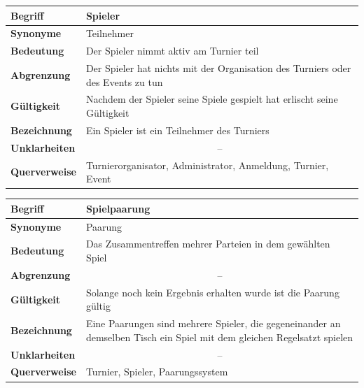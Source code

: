 \documentclass[11pt]{article}
\begin{document}
\begin{tabularx}{\textwidth}{| p{} | p{} |}
	\hline
	\textbf{Begriff} & Spieler\\
	\hline
	\textbf{Synonyme} & Teilnehmer \\
	\hline
	\textbf{Bedeutung} & Der Spieler nimmt aktiv am Turnier teil\\
	\hline
	\textbf{Abgrenzung} & Der Spieler hat nichts mit der Organisation des Turniers oder des Events zu tun\\
	\hline
	\textbf{Gültigkeit} & Nachdem der Spieler seine Spiele gespielt hat erlischt seine Gültigkeit\\
	\hline
	\textbf{Bezeichnung} & Ein Spieler ist ein Teilnehmer des Turniers\\
	\hline
	\textbf{Unklarheiten} & \multicolumn{1}{c|}{--} \\
	\hline
	\textbf{Querverweise} & Turnierorganisator, Administrator, Anmeldung, Turnier, Event \\
	\hline
\end{tabularx}
	
\begin{tabularx}{\textwidth}{| p{} | p{} |}
	\hline
	\textbf{Begriff} & Spielpaarung\\
	\hline
	\textbf{Synonyme} & Paarung\\
	\hline
	\textbf{Bedeutung} & Das Zusammentreffen mehrer Parteien in dem gewählten Spiel\\
	\hline
	\textbf{Abgrenzung} & \multicolumn{1}{c|}{--} \\
	\hline
	\textbf{Gültigkeit} & Solange noch kein Ergebnis erhalten wurde ist die Paarung gültig\\
	\hline
	\textbf{Bezeichnung} & Eine Paarungen sind mehrere Spieler, die gegeneinander an demselben Tisch ein Spiel mit dem gleichen Regelsatzt spielen\\
	\hline 
	\textbf{Unklarheiten} & \multicolumn{1}{c|}{--} \\
	\hline
	\textbf{Querverweise} &  Turnier, Spieler, Paarungssystem\\
	\hline
\end{tabularx}

\newpage
\end{document}

